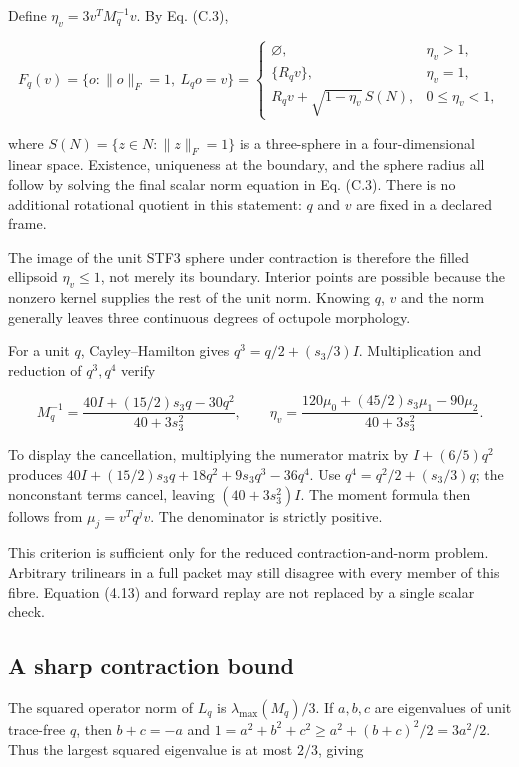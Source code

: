 \documentclass[
  11pt,
  a4paper]{article}
\begin{document}
Define \(\eta_v=3v^TM_q^{-1}v\). By Eq. (C.3),

\[
F_q(v)=\{o:\|o\|_F=1,\ L_qo=v\}
=\begin{cases}
\varnothing,&\eta_v>1,\\
\{R_qv\},&\eta_v=1,\\
R_qv+\sqrt{1-\eta_v}\,S(N),&0\le\eta_v<1,
\end{cases}
\tag{C.4}
\]

where \(S(N)=\{z\in N:\|z\|_F=1\}\) is a three-sphere in a four-dimensional linear space. Existence, uniqueness at the boundary, and the sphere radius all follow by solving the final scalar norm equation in Eq. (C.3). There is no additional rotational quotient in this statement: \(q\) and \(v\) are fixed in a declared frame.

The image of the unit STF3 sphere under contraction is therefore the filled ellipsoid \(\eta_v\le1\), not merely its boundary. Interior points are possible because the nonzero kernel supplies the rest of the unit norm. Knowing \(q\), \(v\) and the norm generally leaves three continuous degrees of octupole morphology.

For a unit \(q\), Cayley--Hamilton gives \(q^3=q/2+(s_3/3)I\). Multiplication and reduction of \(q^3,q^4\) verify

\[
M_q^{-1}=\frac{40I+(15/2)s_3q-30q^2}{40+3s_3^2},
\qquad
\eta_v=\frac{120\mu_0+(45/2)s_3\mu_1-90\mu_2}{40+3s_3^2}.
\tag{C.5}
\]

To display the cancellation, multiplying the numerator matrix by \(I+(6/5)q^2\) produces
\(40I+(15/2)s_3q+18q^2+9s_3q^3-36q^4\).
Use \(q^4=q^2/2+(s_3/3)q\); the nonconstant terms cancel, leaving \((40+3s_3^2)I\). The moment formula then follows from \(\mu_j=v^Tq^jv\). The denominator is strictly positive.

This criterion is sufficient only for the reduced contraction-and-norm problem. Arbitrary trilinears in a full packet may still disagree with every member of this fibre. Equation (4.13) and forward replay are not replaced by a single scalar check.

\hypertarget{c.3-a-sharp-contraction-bound}{%
\subsection{A sharp contraction bound}\label{c.3-a-sharp-contraction-bound}}

The squared operator norm of \(L_q\) is \(\lambda_{\max}(M_q)/3\). If \(a,b,c\) are eigenvalues of unit trace-free \(q\), then \(b+c=-a\) and
\(1=a^2+b^2+c^2\ge a^2+(b+c)^2/2=3a^2/2\).
Thus the largest squared eigenvalue is at most \(2/3\), giving
\end{document}
